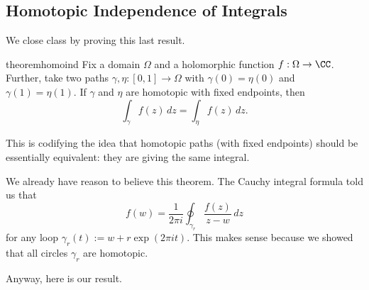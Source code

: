 \subsection{Homotopic Independence of Integrals}
We close class by proving this last result.
\begin{restatable}{theorem}{homoind} \label{thm:homoind}
	Fix a domain $\Omega$ and a holomorphic function $f:\Omega\to\CC$. Further, take two paths $\gamma,\eta:[0,1]\to\Omega$ with $\gamma(0)=\eta(0)$ and $\gamma(1)=\eta(1)$. If $\gamma$ and $\eta$ are homotopic with fixed endpoints, then
	\[\int_\gamma f(z)\,dz=\int_\eta f(z)\,dz.\]
\end{restatable}
This is codifying the idea that homotopic paths (with fixed endpoints) should be essentially equivalent: they are giving the same integral.
\begin{example}
	We already have reason to believe this theorem. The Cauchy integral formula told us that
	\[f(w)=\frac1{2\pi i}\oint_{\gamma_r}\frac{f(z)}{z-w}\,dz\]
	for any loop $\gamma_r(t):=w+r\exp(2\pi it)$. This makes sense because we showed that all circles $\gamma_r$ are homotopic.
\end{example}
Anyway, here is our result.
